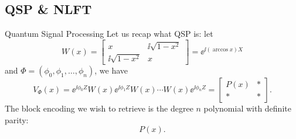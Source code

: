 \subsection{QSP \& NLFT}
\begin{frame}{Quantum Signal Processing}
    Let us recap what QSP is: let
    \begin{equation}
        W(x) = \left[\begin{matrix}
            x & \ii\sqrt{1-x^2} \\ \ii\sqrt{1-x^2} & x
        \end{matrix}\right] = \ee^{\ii(\arccos x)X}
    \end{equation}
    and $\Phi = (\phi_0,\phi_1,\ldots,\phi_n)$, we have
    \begin{equation}
        V_\Phi(x) = \ee^{\ii\phi_0Z} W(x) \ee^{\ii\phi_1Z} W(x) \cdots W(x) \ee^{\ii\phi_nZ} = \left[\begin{matrix}
            P(x) & * \\ * & *
        \end{matrix}\right].
    \end{equation}
    The block encoding we wish to retrieve is the {\color{red}degree $n$} polynomial with definite parity:
    \begin{equation}
        P(x).
    \end{equation}
\end{frame}
